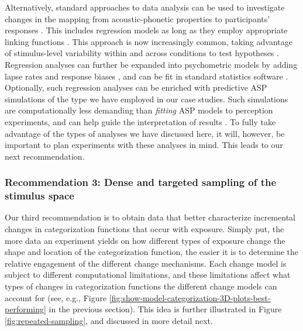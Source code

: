 \documentclass[
  11pt,
  man,floatsintext]{apa6}
\begin{document}
Alternatively, standard approaches to data analysis can be used to investigate changes in the mapping from acoustic-phonetic properties to participants' responses \autocite[for an excellent review, see][]{schertz-clare2020}. This includes regression models as long as they employ appropriate linking functions \autocites[e.g., logistic or multinomial regression for categorization,][]{jaeger2008,winter-wieling2016}. This approach is now increasingly common, taking advantage of stimulus-level variability within and across conditions to test hypotheses \autocites[e.g.,][]{clayards2018,idemaru-holt2020,schertz2015}. Regression analyses can further be expanded into psychometric models \autocite{wichmann-hill2001} by adding lapse rates and response biases \autocites[e.g.,][]{clayards2008,kleinschmidt2020}, and can be fit in standard statistics software \autocite[e.g., \texttt{brms},][]{burkner2017}. Optionally, such regression analyses can be enriched with predictive ASP simulations of the type we have employed in our case studies. Such simulations are computationally less demanding than \emph{fitting} ASP models to perception experiments, and can help guide the interpretation of results \autocites[for examples of approaches that mix predictive simulation with standard data analysis, see][]{bejjanki2011,clayards2008,hitczenko-feldman2016,tan2021,theodore-monto2019,xie2021cognition}[see also discussion in][]{bent-baeseberk2021}. To fully take advantage of the types of analyses we have discussed here, it will, however, be important to plan experiments with these analyses in mind. This leads to our next recommendation.

\hypertarget{recommendation-3-dense-and-targeted-sampling-of-the-stimulus-space}{%
\subsubsection{Recommendation 3: Dense and targeted sampling of the stimulus space}\label{recommendation-3-dense-and-targeted-sampling-of-the-stimulus-space}}

Our third recommendation is to obtain data that better characterize incremental changes in categorization functions that occur with exposure. Simply put, the more data an experiment yields on how different types of exposure change the shape and location of the categorization function, the easier it is to determine the relative engagement of the different change mechanisms. Each change model is subject to different computational limitations, and these limitations affect what types of changes in categorization functions the different change models can account for (see, e.g., Figure \ref{fig:show-model-categorization-3D-plots-best-performing} in the previous section). This idea is further illustrated in Figure \ref{fig:repeated-sampling}, and discussed in more detail next.
\end{document}

